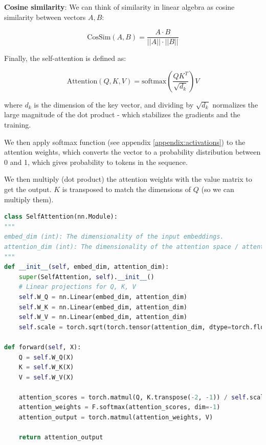 \textbf{Cosine similarity}: We can think of similarity in linear algebra as cosine similarity between vectors $A, B$: 

\[ \text{CosSim} (A, B) = \frac{A \cdot B}{||A||\cdot ||B||} \]

Finally, the self-attention is defined as:

\begin{equation}
    \text{Attention}(Q, K, V) = \text{softmax}\left( \frac{QK^T}{\sqrt{d_k}} \right) V
    \label{eq:self_attention}
\end{equation}

where $d_k$ is the dimension of the key vector, and dividing by $\sqrt{d_k}$ normalizes the large magnitude of the dot product - which stabilizes the gradients and the training.

We then apply softmax function (see appendix \ref{appendix:activations}) to the attention weights, which converts the vector to a probability distribution between 0 and 1, which gives probability to tokens in the sequence. 

We then multiply (dot product) the attention weights with the value matrix to get the output. $K$ is transposed to match the dimensions of $Q$ (so we can multiply them).

\begin{lstlisting}[language=Python, breaklines=true, caption={Full implementation of a single self-attention block.}]
class SelfAttention(nn.Module):
"""
embed_dim (int): The dimensionality of the input embeddings.
attention_dim (int): The dimensionality of the attention space / attention vectors (Q, K, V).
"""
def __init__(self, embed_dim, attention_dim):
    super(SelfAttention, self).__init__()
    # Linear projections for Q, K, V
    self.W_Q = nn.Linear(embed_dim, attention_dim)
    self.W_K = nn.Linear(embed_dim, attention_dim)
    self.W_V = nn.Linear(embed_dim, attention_dim)
    self.scale = torch.sqrt(torch.tensor(attention_dim, dtype=torch.float32))

def forward(self, X):
    Q = self.W_Q(X)
    K = self.W_K(X)
    V = self.W_V(X)

    attention_scores = torch.matmul(Q, K.transpose(-2, -1)) / self.scale
    attention_weights = F.softmax(attention_scores, dim=-1)
    attention_output = torch.matmul(attention_weights, V)

    return attention_output
\end{lstlisting}










